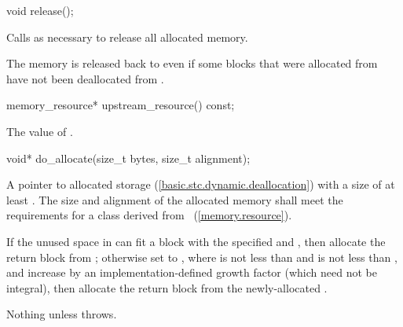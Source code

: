 %
\begin{itemdecl}
void release();
\end{itemdecl}

\begin{itemdescr}
\pnum
\effects
Calls  as necessary
to release all allocated memory.

\pnum
\enternote
The memory is released back to 
even if some blocks that were allocated from 
have not been deallocated from .\exitnote
\end{itemdescr}

%
\begin{itemdecl}
memory_resource* upstream_resource() const;
\end{itemdecl}

\begin{itemdescr}
\pnum
\returns
The value of .
\end{itemdescr}

%
\begin{itemdecl}
void* do_allocate(size_t bytes, size_t alignment);
\end{itemdecl}

\begin{itemdescr}
\pnum
\returns
A pointer to allocated storage (\ref{basic.stc.dynamic.deallocation})
with a size of at least .
The size and alignment of the allocated memory shall meet the requirements
for a class derived from ~(\ref{memory.resource}).

\pnum
\effects
If the unused space in 
can fit a block with the specified  and ,
then allocate the return block from ;
otherwise set  to ,
where  is not less than  and
 is not less than ,
and increase 
by an implementation-defined growth factor (which need not be integral),
then allocate the return block from the newly-allocated .

\pnum
\throws
Nothing unless  throws.
\end{itemdescr}

